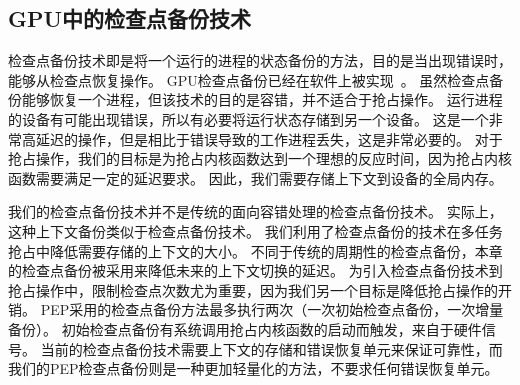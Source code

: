 \subsection{GPU中的检查点备份技术}
检查点备份技术即是将一个运行的进程的状态备份的方法，目的是当出现错误时，能够从检查点恢复操作。
GPU检查点备份已经在软件上被实现~。
虽然检查点备份能够恢复一个进程，但该技术的目的是容错，并不适合于抢占操作。
运行进程的设备有可能出现错误，所以有必要将运行状态存储到另一个设备。
这是一个非常高延迟的操作，但是相比于错误导致的工作进程丢失，这是非常必要的。
对于抢占操作，我们的目标是为抢占内核函数达到一个理想的反应时间，因为抢占内核函数需要满足一定的延迟要求。
因此，我们需要存储上下文到设备的全局内存。

我们的检查点备份技术并不是传统的面向容错处理的检查点备份技术。
实际上，这种上下文备份类似于检查点备份技术。
我们利用了检查点备份的技术在多任务抢占中降低需要存储的上下文的大小。
不同于传统的周期性的检查点备份，本章的检查点备份被采用来降低未来的上下文切换的延迟。
为引入检查点备份技术到抢占操作中，限制检查点次数尤为重要，因为我们另一个目标是降低抢占操作的开销。
PEP采用的检查点备份方法最多执行两次（一次初始检查点备份，一次增量备份）。
初始检查点备份有系统调用抢占内核函数的启动而触发，来自于硬件信号。
当前的检查点备份技术需要上下文的存储和错误恢复单元来保证可靠性，而我们的PEP检查点备份则是一种更加轻量化的方法，不要求任何错误恢复单元。




